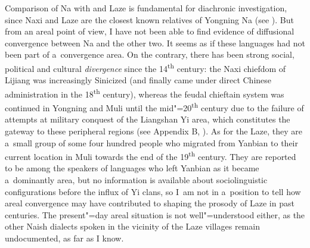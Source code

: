 Comparison of Na with  and Laze is fundamental for {diachronic} investigation, since Naxi and Laze are the closest known relatives of Yongning Na (see ). But from an areal point of view, I have not been able to find evidence of diffusional convergence between Na and the other two. It seems as if these languages had not been part of a~convergence area. On the contrary, there has been strong social, political and cultural \textit{divergence} since the 14\textsuperscript{th} century: the Naxi chiefdom of Lijiang was increasingly Sinicized (and finally came under direct Chinese administration in the 18\textsuperscript{th} century), whereas the
feudal chieftain system was continued in Yongning and Muli until the mid"=20\textsuperscript{th} century due to the failure of attempts at military conquest of the Liangshan Yi area, which constitutes the gateway to these peripheral regions (see Appendix B, ). As for the Laze, they are a~small group of some four hundred people who migrated from Yanbian to their
current location in Muli towards the end of the 19\textsuperscript{th} century. They are reported to be among the speakers of  languages who left Yanbian as it became a~dominantly  area, but no information is available about sociolinguistic configurations before the influx of Yi clans, so I~am not in a~position to tell how areal convergence may have contributed to shaping the prosody of Laze in past centuries. The present"=day areal situation is not well"=understood either, as the other Naish dialects spoken in the vicinity of the Laze villages remain undocumented, as far as I know.


